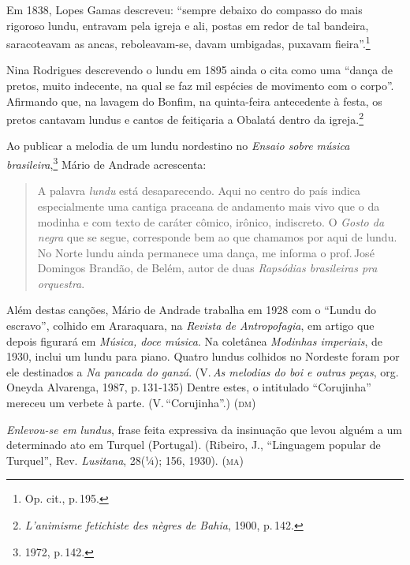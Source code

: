 Em 1838, Lopes Gamas descreveu: ``sempre debaixo do compasso do mais
rigoroso lundu, entravam pela igreja e ali, postas em redor de tal
bandeira, saracoteavam as ancas, reboleavam-se, davam umbigadas, puxavam
fieira''.\footnote{Op. cit., p.\,195.}

Nina Rodrigues descrevendo o lundu em 1895 ainda o cita como uma ``dança
de pretos, muito indecente, na qual se faz mil espécies de movimento com
o corpo''. Afirmando que, na lavagem do Bonfim, na quinta-feira
antecedente à festa, os pretos cantavam lundus e cantos de feitiçaria a
Obalatá dentro da igreja.\footnote{\emph{L'animisme fetichiste des nègres de
Bahia}, 1900, p.\,142.} %

Ao publicar a melodia de um lundu nordestino no \emph{Ensaio sobre
música brasileira},\footnote{1972, p.\,142.} Mário de Andrade acrescenta: 

\begin{quote}
A palavra \textit{lundu} está desaparecendo. Aqui no centro do país indica
especialmente uma cantiga praceana de andamento mais vivo que o da
modinha e com texto de caráter cômico, irônico, indiscreto. O
\emph{Gosto da negra} que se segue, corresponde bem ao que chamamos por
aqui de lundu. No Norte lundu ainda permanece uma dança, me informa o
prof.\,José Domingos Brandão, de Belém, autor de duas \emph{Rapsódias
brasileiras pra orquestra}.
\end{quote}



Além destas canções, Mário de Andrade
trabalha em 1928 com o ``Lundu do escravo'', colhido em
Araraquara, na \emph{Revista de Antropofagia}, em artigo que depois
figurará em \emph{Música, doce música}. Na coletânea \emph{Modinhas
imperiais}, de 1930, inclui um lundu para piano. Quatro lundus colhidos
no Nordeste foram por ele destinados a \emph{Na pancada do ganzá}. (V.\,\emph{As melodias do boi e outras peças}, org. Oneyda Alvarenga, 1987,
p.\,131-135) Dentre estes, o intitulado ``Corujinha'' mereceu um
verbete à parte. (V.\,``Corujinha''.) (\textsc{dm})

\textit{Enlevou-se em lundus}, frase feita expressiva da insinuação que levou
alguém a um determinado ato em Turquel (Portugal). (Ribeiro, J.,
``Linguagem popular de Turquel'', Rev. \emph{Lusitana}, 28(¼); 156, 1930).
(\textsc{ma})

